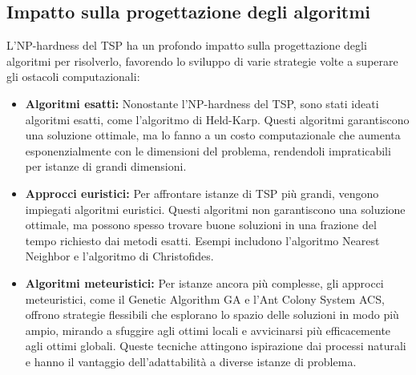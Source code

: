 \subsection{Impatto sulla progettazione degli algoritmi}

L'\gls{NP}-hardness del \gls{TSP} ha un profondo impatto sulla progettazione degli algoritmi per risolverlo, favorendo lo sviluppo di varie strategie volte a superare gli ostacoli computazionali:

\begin{itemize}
	\item \textbf{Algoritmi esatti:} Nonostante l'\gls{NP}-hardness del \gls{TSP}, sono stati ideati algoritmi esatti, come l'algoritmo di Held-Karp. Questi algoritmi garantiscono una soluzione ottimale, ma lo fanno a un costo computazionale che aumenta esponenzialmente con le dimensioni del problema, rendendoli impraticabili per istanze di grandi dimensioni.
	\item \textbf{Approcci euristici:} Per affrontare istanze di \gls{TSP} più grandi, vengono impiegati algoritmi euristici. Questi algoritmi non garantiscono una soluzione ottimale, ma possono spesso trovare buone soluzioni in una frazione del tempo richiesto dai metodi esatti. Esempi includono l'algoritmo Nearest Neighbor e l'algoritmo di Christofides.
  \item \textbf{Algoritmi meteuristici:} Per istanze ancora più complesse, gli approcci meteuristici, come il Genetic Algorithm \gls{GA} e l'Ant Colony System \gls{ACS}, offrono strategie flessibili che esplorano lo spazio delle soluzioni in modo più ampio, mirando a sfuggire agli ottimi locali e avvicinarsi più efficacemente agli ottimi globali. Queste tecniche attingono ispirazione dai processi naturali e hanno il vantaggio dell'adattabilità a diverse istanze di problema.
\end{itemize}
